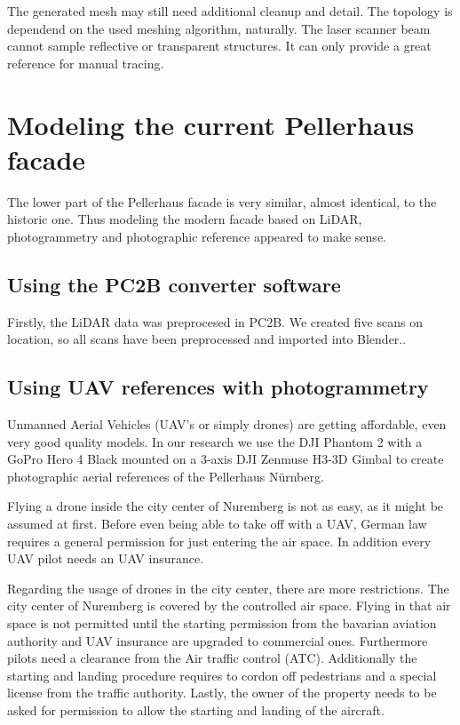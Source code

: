The generated mesh may still need additional cleanup and detail. The topology is dependend on the used meshing algorithm, naturally. The laser scanner beam cannot sample reflective or transparent structures. It can only provide a great reference for manual tracing.

\section{Modeling the current Pellerhaus facade}

The lower part of the Pellerhaus facade is very similar, almost identical, to the historic one. Thus modeling the modern facade based on LiDAR, photogrammetry and photographic reference appeared to make sense.

\subsection{Using the PC2B converter software}

Firstly, the LiDAR data was preprocesed in PC2B. We created five scans on location, so all scans have been preprocessed and imported into Blender.\parencite{dp_lidar}.

\subsection{Using UAV references with photogrammetry}

Unmanned Aerial Vehicles (UAV's or simply drones) are getting affordable, even very good quality models. In our research we use the DJI Phantom 2 with a GoPro Hero 4 Black mounted on a 3-axis DJI Zenmuse H3-3D Gimbal to create photographic aerial references of the Pellerhaus Nürnberg.

Flying a drone inside the city center of Nuremberg is not as easy, as it might be assumed at first. Before even being able to take off with a UAV, German law requires a general permission for just entering the air space. In addition every UAV pilot needs an UAV insurance.

Regarding the usage of drones in the city center, there are more restrictions. The city center of Nuremberg is covered by the controlled air space. Flying in that air space is not permitted until the starting permission from the bavarian aviation authority and UAV insurance are upgraded to commercial ones. Furthermore pilots need a clearance from the Air traffic control (ATC). Additionally the starting and landing procedure requires to cordon off pedestrians and a special license from the traffic authority. Lastly, the owner of the property needs to be asked for permission to allow the starting and landing of the aircraft.

